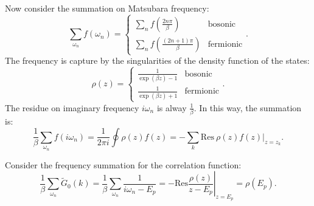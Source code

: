 \begin{framedrmk}
Now consider the summation on Matsubara frequency:
\begin{equation}
	\sum_{\omega_n} f(\omega_n) = 
	\begin{cases}
		\sum_n f(\frac{2n\pi}{\beta}) & \mathrm{bosonic} \\
		\sum_n f(\frac{(2n+1)\pi}{\beta}) & \mathrm{fermionic}
	\end{cases}.
\end{equation}
The frequency is capture by the singularities of the density function of the states:
\begin{equation}
	\rho(z) = \begin{cases}
		\frac{1}{\exp(\beta z)-1} & \mathrm{bosonic} \\
		\frac{1}{\exp(\beta z)+1} & \mathrm{fermionic}
	\end{cases}.
\end{equation}
The residue on imaginary frequency $i\omega_n$ is alway $\frac{1}{\beta}$. In this way, the summation is:
\begin{equation}
	\frac{1}{\beta}\sum_{\omega_n} f(i\omega_n) 
	= \frac{1}{2\pi i} \oint \rho(z)f(z)
	= -\sum_{k} \mathrm{Res}\ \rho(z)f(z)|_{z=z_k}.
\end{equation}
\end{framedrmk}

\begin{framedexpl}
Consider the frequency summation for the correlation function:
\begin{equation*}
	\frac{1}{\beta}\sum_{\omega_n} \tilde{G}_0(k) 
	= \frac{1}{\beta}\sum_{\omega_n}\frac{1}{i\omega_n-E_{p}}
	= -\mathrm{Res} \left. \frac{\rho(z)}{z-E_{p}}\right|_{z=E_{p}}
	= \rho(E_{p}).
\end{equation*}
\end{framedexpl}

